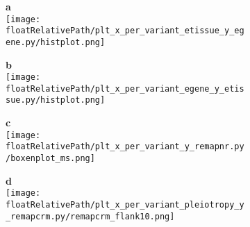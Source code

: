 %
%

\begin{figure}[!ht]

    \centering

    \begin{subfigure}[]{.49\textwidth}
        \textbf{a}
        \\
        \texttt{[image: \\floatRelativePath/plt\_x\_per\_variant\_etissue\_y\_egene.py/histplot.png]}
    \end{subfigure}
    \begin{subfigure}[]{.49\textwidth}
        \textbf{b}
        \\
        \texttt{[image: \\floatRelativePath/plt\_x\_per\_variant\_egene\_y\_etissue.py/histplot.png]}
    \end{subfigure}


    \begin{subfigure}[]{.49\textwidth}
        \textbf{c}
        \\
        \texttt{[image: \\floatRelativePath/plt\_x\_per\_variant\_y\_remapnr.py/boxenplot\_ms.png]}
    \end{subfigure}
    \begin{subfigure}[]{.49\textwidth}
        \textbf{d}
        \\
        \texttt{[image: \\floatRelativePath/plt\_x\_per\_variant\_pleiotropy\_y\_remapcrm.py/remapcrm\_flank10.png]}
    \end{subfigure}

    \caption{}

\end{figure}

